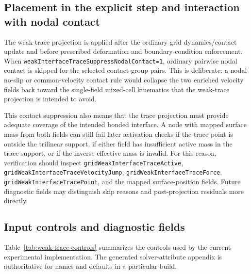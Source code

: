 \subsection{Placement in the explicit step and interaction with nodal contact}

The weak-trace projection is applied after the ordinary grid dynamics/contact update and before prescribed deformation and boundary-condition enforcement.  When \texttt{weakInterfaceTraceSuppressNodalContact=1}, ordinary pairwise nodal contact is skipped for the selected contact-group pairs.  This is deliberate: a nodal no-slip or common-velocity contact rule would collapse the two enriched velocity fields back toward the single-field mixed-cell kinematics that the weak-trace projection is intended to avoid.

This contact suppression also means that the trace projection must provide adequate coverage of the intended bonded interface.  A node with mapped surface mass from both fields can still fail later activation checks if the trace point is outside the trilinear support, if either field has insufficient active mass in the trace support, or if the inverse effective mass is invalid.  For this reason, verification should inspect \texttt{gridWeakInterfaceTraceActive}, \texttt{gridWeakInterfaceTraceVelocityJump}, \texttt{gridWeakInterfaceTraceForce}, \texttt{gridWeakInterfaceTracePoint}, and the mapped surface-position fields.  Future diagnostic fields may distinguish skip reasons and post-projection residuals more directly.

\subsection{Input controls and diagnostic fields}
\label{subsec:weak-trace-controls}

Table~\ref{tab:weak-trace-controls} summarizes the controls used by the current experimental implementation.  The generated solver-attribute appendix is authoritative for names and defaults in a particular build.

